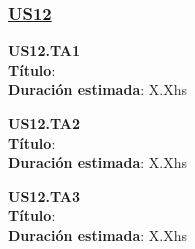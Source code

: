 \subsubsection*{\underline{US12}}

\begin{tcolorbox}
\textbf{US12.TA1} \\
\textbf{Título}:  \\
\textbf{Duración estimada}: X.Xhs
\end{tcolorbox}
\vspace{10pt}

\begin{tcolorbox}
\textbf{US12.TA2} \\
\textbf{Título}:  \\
\textbf{Duración estimada}: X.Xhs
\end{tcolorbox}
\vspace{10pt}

\begin{tcolorbox}
\textbf{US12.TA3} \\
\textbf{Título}:  \\
\textbf{Duración estimada}: X.Xhs
\end{tcolorbox}
\vspace{10pt}

